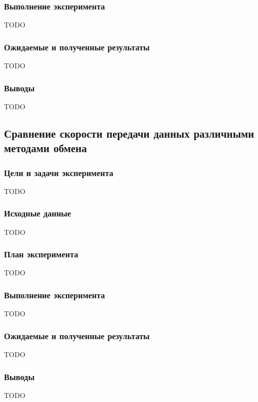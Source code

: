 \subsubsection*{Выполнение эксперимента}

TODO

\subsubsection*{Ожидаемые и полученные результаты}

TODO

\subsubsection*{Выводы}

TODO

\subsection{Сравнение скорости передачи данных различными методами обмена}

\subsubsection*{Цели и задачи эксперимента}

TODO

\subsubsection*{Исходные данные}

TODO

\subsubsection*{План эксперимента}

TODO

\subsubsection*{Выполнение эксперимента}

TODO

\subsubsection*{Ожидаемые и полученные результаты}

TODO

\subsubsection*{Выводы}

TODO

\clearpage
\newpage
